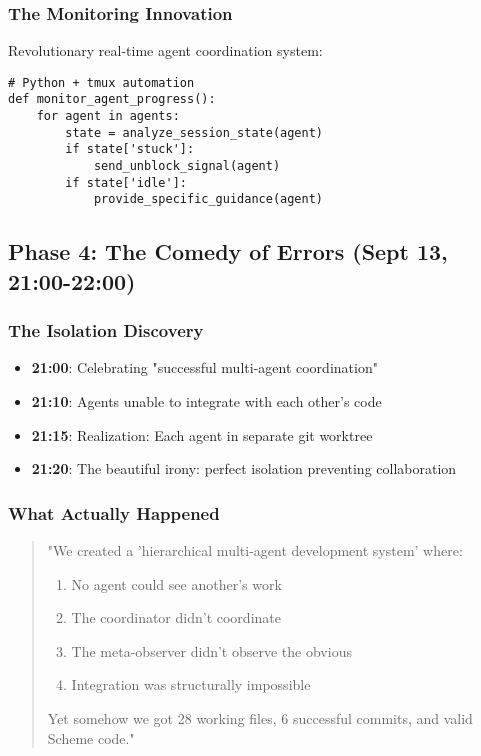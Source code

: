 \documentclass[11pt]{article}
\begin{document}
\subsubsection{The Monitoring Innovation}
\label{sec:org8bae202}
Revolutionary real-time agent coordination system:
\begin{verbatim}
# Python + tmux automation
def monitor_agent_progress():
    for agent in agents:
        state = analyze_session_state(agent)
        if state['stuck']: 
            send_unblock_signal(agent)
        if state['idle']:
            provide_specific_guidance(agent)
\end{verbatim}
\subsection{Phase 4: The Comedy of Errors (Sept 13, 21:00-22:00)}
\label{sec:orga8d13f5}
\subsubsection{The Isolation Discovery}
\label{sec:org56c5a1d}
\begin{itemize}
\item \textbf{\textbf{21:00}}: Celebrating "successful multi-agent coordination"
\item \textbf{\textbf{21:10}}: Agents unable to integrate with each other's code
\item \textbf{\textbf{21:15}}: Realization: Each agent in separate git worktree
\item \textbf{\textbf{21:20}}: The beautiful irony: perfect isolation preventing collaboration
\end{itemize}
\subsubsection{What Actually Happened}
\label{sec:orgc64cff6}
\begin{quote}
"We created a 'hierarchical multi-agent development system' where:
\begin{enumerate}
\item No agent could see another's work
\item The coordinator didn't coordinate
\item The meta-observer didn't observe the obvious
\item Integration was structurally impossible
\end{enumerate}

Yet somehow we got 28 working files, 6 successful commits, 
and valid Scheme code."
\end{quote}
\end{document}
